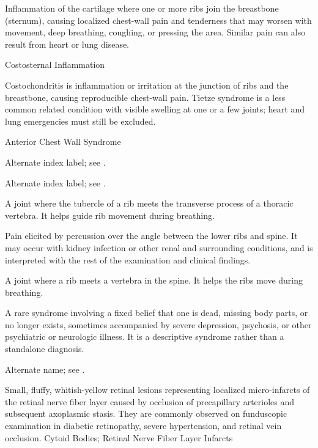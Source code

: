  Inflammation of the cartilage where one or more ribs join the breastbone (sternum), causing localized chest-wall pain and tenderness that may worsen with movement, deep breathing, coughing, or pressing the area. Similar pain can also result from heart or lung disease.

\synonyms
Costosternal Inflammation

 Costochondritis is inflammation or irritation at the junction of ribs and the breastbone, causing reproducible chest-wall pain. Tietze syndrome is a less common related condition with visible swelling at one or a few joints; heart and lung emergencies must still be excluded.

\synonyms
Anterior Chest Wall Syndrome

 Alternate index label; see .

 Alternate index label; see .

 A joint where the tubercle of a rib meets the transverse process of a thoracic vertebra. It helps guide rib movement during breathing.

 Pain elicited by percussion over
the angle between the lower ribs and spine. It may occur with kidney infection
or other renal and surrounding conditions, and is interpreted with the rest
of the examination and clinical findings.

 A joint where a rib meets a vertebra in the spine. It helps the ribs move during breathing.

 A rare syndrome involving a fixed belief that one is dead, missing body parts, or no longer exists, sometimes accompanied by severe depression, psychosis, or other psychiatric or neurologic illness. It is a descriptive syndrome rather than a standalone diagnosis.

 Alternate name; see .

 Small, fluffy, whitish-yellow retinal lesions representing localized micro-infarcts of the retinal nerve fiber layer caused by occlusion of precapillary arterioles and subsequent axoplasmic stasis. They are commonly observed on funduscopic examination in diabetic retinopathy, severe hypertension, and retinal vein occlusion.
\synonyms
Cytoid Bodies; Retinal Nerve Fiber Layer Infarcts

